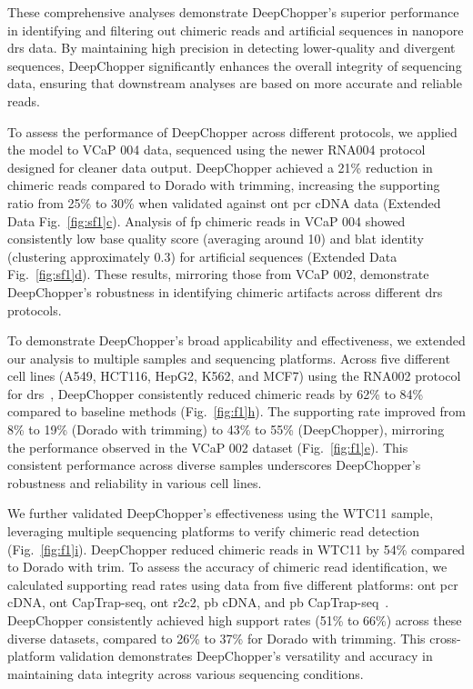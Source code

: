 \documentclass[pdflatex, sn-mathphys-num, lineno]{sn-jnl}%
\newcommand{\figref}[2]{Fig.~\hyperref[#1]{\ref*{#1}#2}}
\newcommand{\edfigref}[2]{Extended Data Fig.~\hyperref[#1]{\ref*{#1}#2}}
\theoremstyle{thmstyleone}%
\theoremstyle{thmstyletwo}%
\theoremstyle{thmstylethree}%
\begin{document}
These comprehensive analyses demonstrate DeepChopper's superior performance in identifying and filtering out chimeric reads and artificial sequences in nanopore \gls{drs} data.
By maintaining high precision in detecting lower-quality and divergent sequences, DeepChopper significantly enhances the overall integrity of sequencing data, ensuring that downstream analyses are based on more accurate and reliable reads.

To assess the performance of DeepChopper across different protocols, we applied the model to VCaP 004 data, sequenced using the newer RNA004 protocol designed for cleaner data output.
DeepChopper achieved a 21\% reduction in chimeric reads compared to Dorado with trimming, increasing the supporting ratio from 25\%  to 30\% when validated against \gls{ont} \gls{pcr} cDNA data (\edfigref{fig:sf1}{c}).
Analysis of \gls{fp} chimeric reads in VCaP 004 showed consistently low base quality score (averaging around 10) and \gls{blat} identity (clustering approximately 0.3) for artificial sequences (\edfigref{fig:sf1}{d}).
These results, mirroring those from VCaP 002, demonstrate DeepChopper's robustness in identifying chimeric artifacts across different \gls{drs} protocols.

To demonstrate DeepChopper's broad applicability  and effectiveness, we extended our analysis to multiple samples and sequencing platforms.
Across five different cell lines (A549, HCT116, HepG2, K562, and MCF7) using the RNA002 protocol for \gls{drs}~\cite{chen2021systematic}, DeepChopper consistently reduced chimeric reads by 62\% to 84\% compared to baseline methods (\figref{fig:f1}{h}).
The supporting rate improved from 8\% to 19\% (Dorado with trimming) to 43\% to 55\% (DeepChopper), mirroring the performance observed in the VCaP 002 dataset (\figref{fig:f1}{e}).
This consistent performance across diverse samples underscores DeepChopper's robustness and reliability in various cell lines.

We further validated DeepChopper's effectiveness using the WTC11 sample, leveraging multiple sequencing platforms to verify chimeric read detection (\figref{fig:f1}{i}).
DeepChopper reduced chimeric reads in WTC11 by 54\% compared to Dorado with trim.
To assess the accuracy of chimeric read identification, we calculated supporting read rates using data from five different platforms: \gls{ont} \gls{pcr} cDNA, \gls{ont} CapTrap-seq, \gls{ont} \gls{r2c2}, \gls{pb} cDNA, and \gls{pb} CapTrap-seq~\cite{carbonell2024captrap}.
DeepChopper consistently achieved high support rates (51\% to 66\%) across these diverse datasets, compared to 26\% to 37\% for Dorado with trimming.
This cross-platform validation demonstrates DeepChopper's versatility and accuracy in maintaining data integrity across various sequencing conditions.
\end{document}
